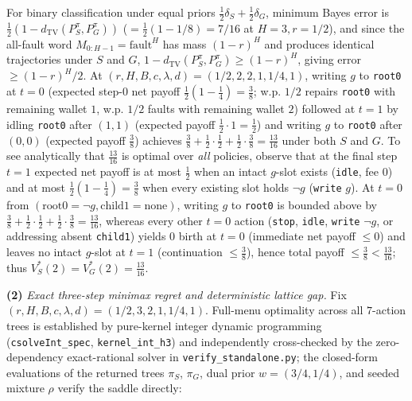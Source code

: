 \documentclass[11pt,a4paper]{article}
\newcounter{none}
\begin{document}
For binary classification under equal priors
\(\frac{1}{2}\delta_S + \frac{1}{2}\delta_G\), minimum Bayes error is
\(\frac{1}{2}(1 - d_{\mathrm{TV}}(P_S^\pi, P_G^\pi))\)
(\(= \frac{1}{2}(1 - 1/8) = 7/16\) at \(H=3, r=1/2\)), and since the
all-fault word \(M_{0:H-1} = \mathrm{fault}^H\) has mass \((1-r)^H\) and
produces identical trajectories under \(S\) and \(G\),
\(1 - d_{\mathrm{TV}}(P_S^\pi, P_G^\pi) \ge (1-r)^H\), giving error
\(\ge (1-r)^H/2\). At \((r,H,B,c,\lambda,d) = (1/2, 2, 2, 1, 1/4, 1)\),
writing \(g\) to \texttt{root0} at \(t=0\) (expected step-0 net payoff
\(\frac{1}{2}(1 - \frac{1}{4}) = \frac{3}{8}\); w.p. \(1/2\) repairs
\texttt{root0} with remaining wallet \(1\), w.p. \(1/2\) faults with
remaining wallet \(2\)) followed at \(t=1\) by idling \texttt{root0}
after \((1,1)\) (expected payoff \(\frac{1}{2}\cdot 1 = \frac{1}{2}\))
and writing \(g\) to \texttt{root0} after \((0,0)\) (expected payoff
\(\frac{3}{8}\)) achieves
\(\frac{3}{8} + \frac{1}{2}\cdot\frac{1}{2} + \frac{1}{2}\cdot\frac{3}{8} = \frac{13}{16}\)
under both \(S\) and \(G\). To see analytically that \(\frac{13}{16}\)
is optimal over \emph{all} policies, observe that at the final step
\(t=1\) expected net payoff is at most \(\frac{1}{2}\) when an intact
\(g\)-slot exists (\texttt{idle}, fee \(0\)) and at most
\(\frac{1}{2}(1 - \frac{1}{4}) = \frac{3}{8}\) when every existing slot
holds \(\neg g\) (\texttt{write} \(g\)). At \(t=0\) from
\((\mathrm{root0}=\neg g, \mathrm{child1}=\mathrm{none})\), writing
\(g\) to \texttt{root0} is bounded above by
\(\frac{3}{8} + \frac{1}{2}\cdot\frac{1}{2} + \frac{1}{2}\cdot\frac{3}{8} = \frac{13}{16}\),
whereas every other \(t=0\) action (\texttt{stop}, \texttt{idle},
\texttt{write} \(\neg g\), or addressing absent \texttt{child1}) yields
\(0\) birth at \(t=0\) (immediate net payoff \(\le 0\)) and leaves no
intact \(g\)-slot at \(t=1\) (continuation \(\le \frac{3}{8}\)), hence
total payoff \(\le \frac{3}{8} < \frac{13}{16}\); thus
\(V_S^*(2) = V_G^*(2) = \frac{13}{16}\).

\textbf{(2)} \emph{Exact three-step minimax regret and deterministic
lattice gap.} Fix \((r, H, B, c, \lambda, d) = (1/2, 3, 2, 1, 1/4, 1)\).
Full-menu optimality across all \(7\)-action trees is established by
pure-kernel integer dynamic programming (\texttt{csolveInt\_spec},
\texttt{kernel\_int\_h3}) and independently cross-checked by the
zero-dependency exact-rational solver in \texttt{verify\_standalone.py};
the closed-form evaluations of the returned trees \(\pi_S\), \(\pi_G\),
dual prior \(w = (3/4, 1/4)\), and seeded mixture \(\rho\) verify the
saddle directly:
\end{document}
